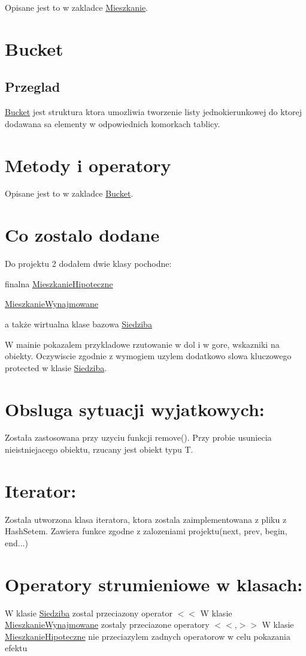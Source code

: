 Opisane jest to w zakladce \hyperlink{class_mieszkanie}{Mieszkanie}.\hypertarget{index_intro_sec5}{}\section{Bucket}\label{index_intro_sec5}
\hypertarget{index_step1}{}\subsection{Przeglad}\label{index_step1}
\hyperlink{struct_bucket}{Bucket} jest struktura ktora umozliwia tworzenie listy jednokierunkowej do ktorej dodawana sa elementy w odpowiednich komorkach tablicy. \hypertarget{index_intro_sec10}{}\section{Metody i operatory}\label{index_intro_sec10}
Opisane jest to w zakladce \hyperlink{struct_bucket}{Bucket}. \hypertarget{index_intro_sec9}{}\section{Co zostalo dodane}\label{index_intro_sec9}
Do projektu 2 dodałem dwie klasy pochodne\+: \begin{DoxyItemize}
\item finalna \hyperlink{class_mieszkanie_hipoteczne}{Mieszkanie\+Hipoteczne}\item \hyperlink{class_mieszkanie_wynajmowane}{Mieszkanie\+Wynajmowane}\item a także wirtualna klase bazowa \hyperlink{class_siedziba}{Siedziba}\end{DoxyItemize}
W mainie pokazalem przykladowe rzutowanie w dol i w gore, wskazniki na obiekty. Oczywiscie zgodnie z wymogiem uzylem dodatkowo slowa kluczowego protected w klasie \hyperlink{class_siedziba}{Siedziba}.\hypertarget{index_intro_sec6}{}\section{Obsluga sytuacji wyjatkowych\+:}\label{index_intro_sec6}
Została zastosowana przy uzyciu funkcji remove(). Przy probie usuniecia nieistniejacego obiektu, rzucany jest obiekt typu T.\hypertarget{index_intro_sec7}{}\section{Iterator\+:}\label{index_intro_sec7}
Zostala utworzona klasa iteratora, ktora zostala zaimplementowana z pliku z Hash\+Setem. Zawiera funkce zgodne z zalozeniami projektu(next, prev, begin, end...) \hypertarget{index_intro_sec8}{}\section{Operatory strumieniowe w klasach\+:}\label{index_intro_sec8}
W klasie \hyperlink{class_siedziba}{Siedziba} zostal przeciazony operator $<$$<$ W klasie \hyperlink{class_mieszkanie_wynajmowane}{Mieszkanie\+Wynajmowane} zostaly przeciazone operatory $<$$<$,$>$$>$ W klasie \hyperlink{class_mieszkanie_hipoteczne}{Mieszkanie\+Hipoteczne} nie przeciazylem zadnych operatorow w celu pokazania efektu 